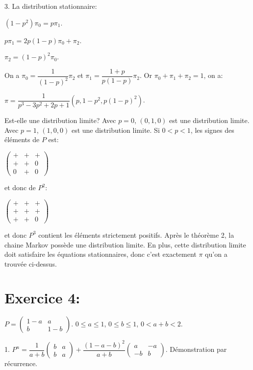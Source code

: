 \documentclass[a4paper,twoside,12pt]{article}
\begin{document}
3. La distribution stationnaire:

$(1-p^2)\pi_0 = p\pi_1$.

$p\pi_1 = 2p(1-p)\pi_0 + \pi_2$.

$\pi_2 = (1-p)^2\pi_0$.

On a $\pi_0 = \dfrac{1}{(1-p)^2}\pi_2$ et $\pi_1 = \dfrac{1+p}{p(1-p)}\pi_2$. Or $\pi_0 + \pi_1 + \pi_2 = 1$, on a:

$\pi = \dfrac{1}{p^3 - 3p^2 + 2p + 1}\left( p, 1-p^2, p(1-p)^2\right)$.

Est-elle une distribution limite? Avec $p=0$, $(0, 1, 0)$ est une distribution limite. Avec $p = 1$, $(1, 0, 0)$ est une distribution limite. Si $0 < p < 1$, les signes des éléments de $P$ est:

$\left(
\begin{array}{ccc}
    + & + & + \\
    + & + & 0 \\
    0 & + & 0
\end{array}
\right)$

et donc de $P^2$:

$\left(
\begin{array}{ccc}
    + & + & + \\
    + & + & + \\
    + & + & 0
\end{array}
\right)$

et donc $P^3$ contient les éléments strictement positifs. Après le théorème 2, la chaine Markov possède une distribution limite. En plus, cette distribution limite doit satisfaire les équations stationnaires, donc c'est exactement $\pi$ qu'on a trouvée ci-dessus.

\section{Exercice 4:}
$P = \left(
\begin{array}{cc}
    1-a & a \\
    b & 1-b
\end{array}
\right)$. $0 \leq a \leq 1$, $0 \leq b \leq 1$, $0 < a+b < 2$.

1. $P^n = \dfrac{1}{a+b}\left(\begin{array}{cc}
    b & a\\
    b & a
\end{array}\right) + \dfrac{(1-a-b)^2}{a+b}\left(\begin{array}{cc}
    a & -a \\
    -b & b
\end{array}\right)$. Démonstration par récurrence.
\end{document}
